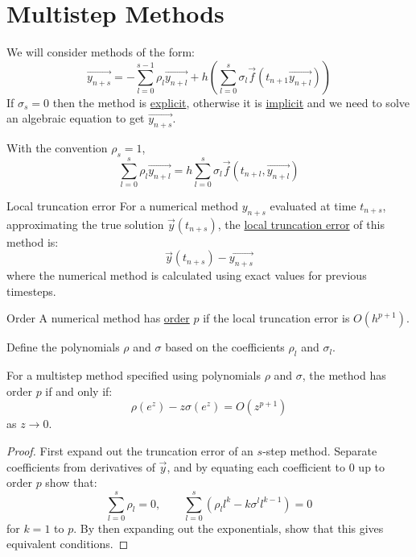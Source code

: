 \documentclass[../Main.tex]{subfiles}
\begin{document}
\section{Multistep Methods}
We will consider methods of the form:
\begin{equation*}
    \vec{y_{n+s}} = - \sum_{l=0}^{s-1} \rho_l \vec{y_{n+l}} + h \left(\sum_{l=0}^{s} \sigma_l \vec{f}(t_{n+1} \vec{y_{n+l}})\right)
\end{equation*}
If $\sigma_s = 0$ then the method is \underline{explicit}, otherwise it is \underline{implicit} and we need to solve an algebraic equation to get $\vec{y_{n+s}}$.

With the convention $\rho_s = 1$,
\begin{equation}
    \sum_{l=0}^{s} \rho_l \vec{y_{n+l}} = h\sum_{l=0}^{s} \sigma_l \vec{f}(t_{n+l}, \vec{y_{n+l}})
    \label{eqnMultistep}
\end{equation}
\begin{definition}{Local truncation error}
    For a numerical method $y_{n+s}$ evaluated at time $t_{n+s}$, approximating the true solution $\vec{y}(t_{n+s})$, the \underline{local truncation error} of this method is:
    \begin{equation*}
        \vec{y}(t_{n+s}) - \vec{y_{n+s}}
    \end{equation*}
    where the numerical method is calculated using exact values for previous timesteps.
\end{definition}
\begin{definition}{Order}
    A numerical method has \underline{order} $p$ if the local truncation error is $O(h^{p+1})$.
\end{definition}
Define the polynomials $\rho$ and $\sigma$ based on the coefficients $\rho_l$ and $\sigma_l$.
\begin{theorem}
    For a multistep method specified using polynomials $\rho$ and $\sigma$, the method has order $p$ if and only if:
    \begin{equation*}
        \rho(e^z) - z\sigma(e^z) = O(z^{p+1})
    \end{equation*}
    as $z \to 0$.
    \label{thmOrderPolynomials}
\end{theorem}
\begin{proof}
    First expand out the truncation error of an $s$-step method. Separate coefficients from derivatives of $\vec{y}$, and by equating each coefficient to $0$ up to order $p$ show that:
    \begin{equation*}
        \sum_{l=0}^{s} \rho_l = 0,\qquad \sum_{l=0}^{s} \left(\rho_l l^k - k \sigma^l l^{k-1}\right) = 0
    \end{equation*}
    for $k = 1$ to $p$. By then expanding out the exponentials, show that this gives equivalent conditions.
\end{proof}
\end{document}
